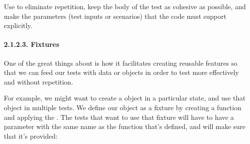 \documentclass[a4paper,10pt,english]{sphinxmanual}
\begin{document}
Use  to eliminate repetition, keep the body
of the test as cohesive as possible, and make the parameters (test inputs or
scenarios) that the code must support explicitly.


\paragraph{2.1.2.3. Fixtures}
\label{\detokenize{chapters/8_unit_testing/index:fixtures}}
One of the great things about  is how it facilitates creating reusable features so that
we can feed our tests with data or objects in order to test more effectively and without
repetition.

For example, we might want to create a  object in a particular state, and use
that object in multiple tests. We define our object as a fixture by creating a function and
applying the . The tests that want to use that fixture will have
to have a parameter with the same name as the function that’s defined, and  will
make sure that it’s provided:
\end{document}
